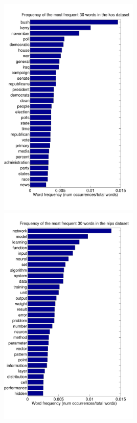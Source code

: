 \begin{frame}
\centerline{
\includegraphics[width=0.5\textwidth]{kos_word_frequency}
\includegraphics[width=0.5\textwidth]{nips_word_frequency}
}
\end{frame}

